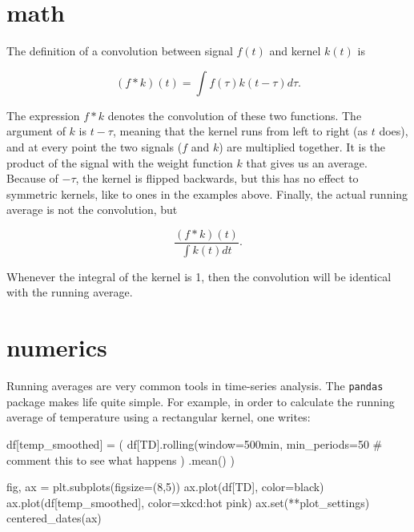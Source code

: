 \documentclass[
  letterpaper,
  DIV=11,
  numbers=noendperiod,
  oneside]{scrreprt}
\newenvironment{Shaded}{\begin{snugshade}}{\end{snugshade}}
\newcommand{\BuiltInTok}[1]{\textcolor[rgb]{0.00,0.23,0.31}{#1}}
\newcommand{\CommentTok}[1]{\textcolor[rgb]{0.37,0.37,0.37}{#1}}
\newcommand{\DecValTok}[1]{\textcolor[rgb]{0.68,0.00,0.00}{#1}}
\newcommand{\NormalTok}[1]{\textcolor[rgb]{0.00,0.23,0.31}{#1}}
\newcommand{\OperatorTok}[1]{\textcolor[rgb]{0.37,0.37,0.37}{#1}}
\newcommand{\StringTok}[1]{\textcolor[rgb]{0.13,0.47,0.30}{#1}}
\begin{document}
\hypertarget{math}{%
\section{math}\label{math}}

The definition of a convolution between signal \(f(t)\) and kernel
\(k(t)\) is

\[
(f * k)(t) = \int f(\tau)k(t-\tau)d\tau.
\]

The expression \(f*k\) denotes the convolution of these two functions.
The argument of \(k\) is \(t-\tau\), meaning that the kernel runs from
left to right (as \(t\) does), and at every point the two signals (\(f\)
and \(k\)) are multiplied together. It is the product of the signal with
the weight function \(k\) that gives us an average. Because of
\(-\tau\), the kernel is flipped backwards, but this has no effect to
symmetric kernels, like to ones in the examples above. Finally, the
actual running average is not the convolution, but

\[
\frac{(f * k)(t)}{\displaystyle \int k(t)dt}.
\]

Whenever the integral of the kernel is 1, then the convolution will be
identical with the running average.

\hypertarget{numerics}{%
\section{numerics}\label{numerics}}

Running averages are very common tools in time-series analysis. The
\texttt{pandas} package makes life quite simple. For example, in order
to calculate the running average of temperature using a rectangular
kernel, one writes:

\begin{Shaded}
\begin{Highlighting}[]
\NormalTok{df[}\StringTok{\textquotesingle{}temp\_smoothed\textquotesingle{}}\NormalTok{] }\OperatorTok{=}\NormalTok{ (}
\NormalTok{                       df[}\StringTok{\textquotesingle{}TD\textquotesingle{}}\NormalTok{].rolling(window}\OperatorTok{=}\StringTok{\textquotesingle{}500min\textquotesingle{}}\NormalTok{,}
\NormalTok{                                        min\_periods}\OperatorTok{=}\DecValTok{50}   \CommentTok{\# comment this to see what happens}
\NormalTok{                                        )}
\NormalTok{                               .mean()}
\NormalTok{                      )}

\NormalTok{fig, ax }\OperatorTok{=}\NormalTok{ plt.subplots(figsize}\OperatorTok{=}\NormalTok{(}\DecValTok{8}\NormalTok{,}\DecValTok{5}\NormalTok{))}
\NormalTok{ax.plot(df[}\StringTok{\textquotesingle{}TD\textquotesingle{}}\NormalTok{], color}\OperatorTok{=}\StringTok{\textquotesingle{}black\textquotesingle{}}\NormalTok{)}
\NormalTok{ax.plot(df[}\StringTok{\textquotesingle{}temp\_smoothed\textquotesingle{}}\NormalTok{], color}\OperatorTok{=}\StringTok{\textquotesingle{}xkcd:hot pink\textquotesingle{}}\NormalTok{)}
\NormalTok{ax.}\BuiltInTok{set}\NormalTok{(}\OperatorTok{**}\NormalTok{plot\_settings)}
\NormalTok{centered\_dates(ax)}
\end{Highlighting}
\end{Shaded}
\end{document}
